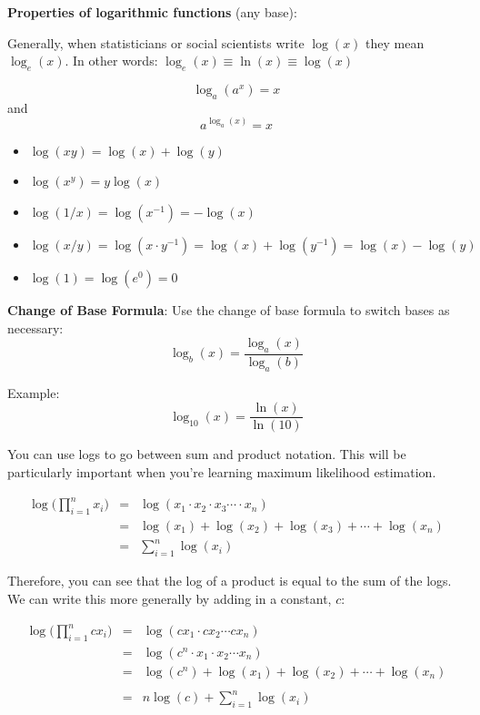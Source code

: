 \documentclass[]{book}
\providecommand{\tightlist}{%
  \setlength{\itemsep}{0pt}\setlength{\parskip}{0pt}}
\theoremstyle{definition}
\theoremstyle{definition}
\theoremstyle{definition}
\theoremstyle{remark}
\begin{document}
\textbf{Properties of logarithmic functions} (any base):

Generally, when statisticians or social scientists write \(\log(x)\) they mean \(\log_e(x)\). In other words: \(\log_e(x) \equiv \ln(x) \equiv \log(x)\)

\[\log_a(a^x)=x\] and
\[a^{\log_a(x)}=x\]

\begin{itemize}
\tightlist
\item
  \(\log(x y)=\log(x)+\log(y)\)
\item
  \(\log(x^y)=y\log(x)\)
\item
  \(\log(1/x)=\log(x^{-1})=-\log(x)\)
\item
  \(\log(x/y)=\log(x\cdot y^{-1})=\log(x)+\log(y^{-1})=\log(x)-\log(y)\)
\item
  \(\log(1)=\log(e^0)=0\)
\end{itemize}

\textbf{Change of Base Formula}: Use the change of base formula to switch bases as necessary:
\[\log_b(x) = \frac{\log_a(x)}{\log_a(b)}\]

Example: \[\log_{10}(x) = \frac{\ln(x)}{\ln(10)}\]

You can use logs to go between sum and product notation. This will be particularly important when you're learning maximum likelihood estimation.

\begin{eqnarray*}
            \log \bigg(\prod\limits_{i=1}^n x_i \bigg) &=& \log(x_1 \cdot x_2 \cdot x_3 \cdots \cdot x_n)\\
            &=& \log(x_1) + \log(x_2) + \log(x_3) + \cdots + \log(x_n)\\
            &=& \sum\limits_{i=1}^n \log (x_i)
\end{eqnarray*}

Therefore, you can see that the log of a product is equal to the sum of the logs. We can write this more generally by adding in a constant, \(c\):

\begin{eqnarray*}
            \log \bigg(\prod\limits_{i=1}^n c x_i\bigg) &=& \log(cx_1 \cdot cx_2 \cdots cx_n)\\
            &=& \log(c^n \cdot x_1 \cdot x_2 \cdots x_n)\\
            &=& \log(c^n) + \log(x_1) + \log(x_2) + \cdots + \log(x_n)\\\\
            &=& n \log(c) +  \sum\limits_{i=1}^n \log (x_i)\\
\end{eqnarray*}
\end{document}
